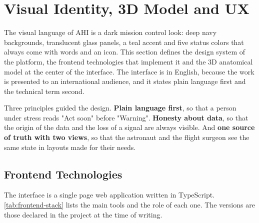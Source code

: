 \section{Visual Identity, 3D Model and UX}
\label{sec:visual-identity-ux}

The visual language of AHI is a dark mission control look: deep navy backgrounds, translucent glass panels, a teal accent and five status colors that always come with words and an icon. This section defines the design system of the platform, the frontend technologies that implement it and the 3D anatomical model at the center of the interface. The interface is in English, because the work is presented to an international audience, and it states plain language first and the technical term second.

Three principles guided the design. \textbf{Plain language first}, so that a person under stress reads "Act soon" before "Warning". \textbf{Honesty about data}, so that the origin of the data and the loss of a signal are always visible. And \textbf{one source of truth with two views}, so that the astronaut and the flight surgeon see the same state in layouts made for their needs.

\subsection{Frontend Technologies}
\label{subsec:frontend-technologies}

The interface is a single page web application written in TypeScript. \ref{tab:frontend-stack} lists the main tools and the role of each one. The versions are those declared in the project at the time of writing.

